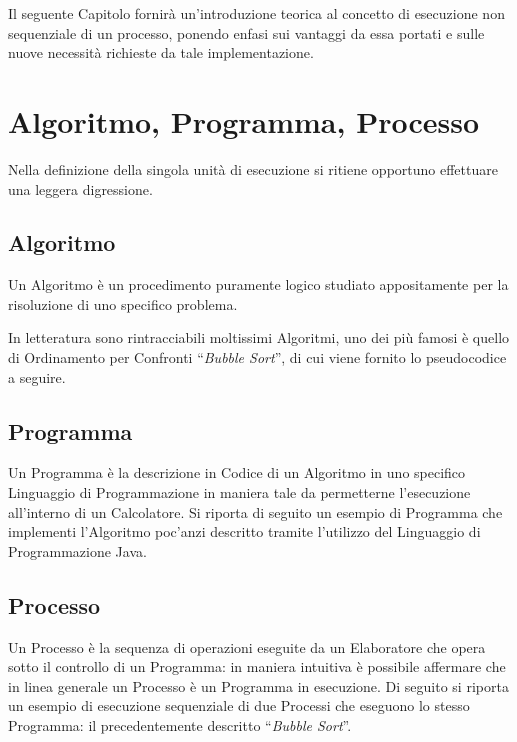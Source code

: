 Il seguente Capitolo fornirà un'introduzione teorica al concetto di esecuzione non sequenziale di un processo, ponendo enfasi sui vantaggi da essa portati e sulle nuove necessità richieste da tale implementazione.

\section[Algoritmo, Programma, Processo]{Algoritmo, Programma, Processo}
Nella definizione della singola unità di esecuzione si ritiene opportuno effettuare una leggera digressione. \par
\subsection*{Algoritmo}
Un Algoritmo è un procedimento puramente logico studiato appositamente per la risoluzione di uno specifico problema. \par
In letteratura sono rintracciabili moltissimi Algoritmi, uno dei più famosi è quello di Ordinamento per Confronti ``\textit{Bubble Sort}''\cite{BubbleSort}, di cui viene fornito lo pseudocodice a seguire. \par

\subsection*{Programma}
Un Programma è la descrizione in Codice di un Algoritmo in uno specifico Linguaggio di Programmazione in maniera tale da permetterne l'esecuzione all'interno di un Calcolatore. Si riporta di seguito un esempio di Programma che implementi l'Algoritmo poc'anzi descritto tramite l'utilizzo del Linguaggio di Programmazione Java. \par

\subsection*{Processo}
Un Processo è la sequenza di operazioni eseguite da un Elaboratore che opera sotto il controllo di un Programma: in maniera intuitiva è possibile affermare che in linea generale un Processo è un Programma in esecuzione. Di seguito si riporta un esempio di esecuzione sequenziale di due Processi che eseguono lo stesso Programma: il precedentemente descritto ``\textit{Bubble Sort}''.



